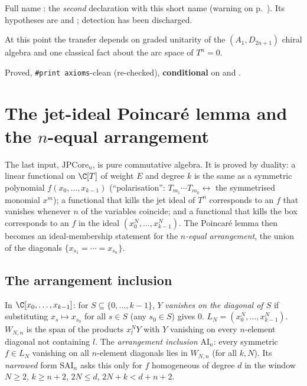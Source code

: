 \begin{dictionary}
Full name : the \emph{second} declaration with this short
name (warning on p.~\pageref{l29:warn:clash}). Its hypotheses are  and ; detection has been discharged.
\end{dictionary}

\begin{physics}
At this point the transfer depends on graded unitarity of the $(A_1,D_{2n+1})$ chiral algebra and one classical fact
about the arc space of $T^n=0$.
\end{physics}

\begin{status}
Proved, \texttt{\#print axioms}-clean (re-checked), \textbf{conditional} on  and .
\end{status}

\section{The jet-ideal Poincar\'e lemma and the \texorpdfstring{$n$}{n}-equal arrangement}\label{l29:sec:arr}

The last input, $\mathrm{JPCore}_n$, is pure commutative algebra. It is proved by duality: a linear functional on
$\C[T]$ of weight $E$ and degree $k$ is the same as a symmetric polynomial $f(x_0,\dots,x_{k-1})$ (``polarisation'':
$T_{m_1}\cdots T_{m_k}\leftrightarrow$ the symmetrised monomial $x^{m}$); a functional that kills the jet ideal of
$T^n$ corresponds to an $f$ that vanishes whenever $n$ of the variables coincide; and a functional that kills the box
corresponds to an $f$ in the ideal $(x_0^N,\dots,x_{k-1}^N)$. The Poincar\'e lemma then becomes an ideal-membership
statement for the \emph{$n$-equal arrangement}, the union of the diagonals $\{x_{s_1}=\cdots=x_{s_n}\}$.

\subsection{The arrangement inclusion}

\begin{definition}\label{l29:def:arrangement}
In $\C[x_0,\dots,x_{k-1}]$: for $S\subseteq\{0,\dots,k-1\}$, $Y$ \emph{vanishes on the diagonal of $S$} if substituting
$x_s\mapsto x_{s_0}$ for all $s\in S$ (any $s_0\in S$) gives $0$. $L_N=(x_0^N,\dots,x_{k-1}^N)$. $W_{N,n}$ is the span of
the products $x_l^NY$ with $Y$ vanishing on every $n$-element diagonal not containing $l$. The \emph{arrangement
inclusion} $\mathrm{AI}_n$: every symmetric $f\in L_N$ vanishing on all $n$-element diagonals lies in $W_{N,n}$ (for all
$k,N$). Its \emph{narrowed} form $\mathrm{SAI}_n$ asks this only for $f$ homogeneous of degree $d$ in the window
$N\ge2$, $k\ge n+2$, $2N\le d$, $2N+k<d+n+2$.
\end{definition}

